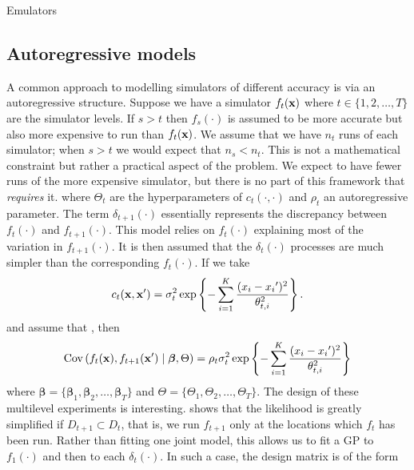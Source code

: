 \begin{chapter}{Emulators \label{Ch:Emulators}}
\subsection{Autoregressive models}
A common approach to modelling simulators of different accuracy is via an autoregressive structure. Suppose we have a simulator $f_t(\mathbf{x})$ where $t \in \{1, 2, \ldots, T\}$ are the simulator levels. If $s>t$ then $f_s(\cdot)$ is assumed to be more accurate but also more expensive to run than $f_t(\mathbf{x})$. We assume that we have $n_{t}$ runs of each simulator; when $s > t$ we would expect that $n_s < n_t$.  This is not a mathematical constraint but rather a practical aspect of the problem. We expect to have fewer runs of the more expensive simulator, but there is no part of this framework that \textit{requires} it. 
where $\Theta_t$ are the hyperparameters of $c_t(\cdot,\cdot)$ and $\rho_t$ an autoregressive parameter. The term $\delta_{t+1}(\cdot)$ essentially represents the discrepancy between $f_t(\cdot)$ and $f_{t+1}(\cdot)$. This model relies on $f_t(\cdot)$ explaining most of the variation in $f_{t+1}(\cdot)$. It is then assumed that the $\delta_t(\cdot)$ processes are much simpler than the corresponding $f_t(\cdot)$.
If we take \begin{equation}
  c_t(\mathbf{x}, \mathbf{x}') = \sigma_t^2 \exp \left\{ - \sum_{i = 1}^K \frac{(x_{i} - {x_i}')^2}{\theta_{t,i}^2} \right\}.
\end{equation}
and assume that , then
\begin{equation}
  \mathrm{Cov}\,(f_t(\mathbf{x}), f_{t+1}(\mathbf{x}')\mid \bm{\beta}, \Theta) = \rho_t \sigma_t^2 \exp \left\{ - \sum_{i = 1}^K \frac{(x_i - {x_i}')^2}{\theta_{t,i}^2} \right\}
\end{equation}
where $\bm{\beta} = \{\bm{\beta}_1, \bm{\beta}_2, \ldots, \bm{\beta}_T\}$ and $\Theta = \{\Theta_1, \Theta_2, \ldots, \Theta_T\}$.
The design of these multilevel experiments is interesting. \citet{Kennedy2000} shows that the likelihood is greatly simplified if $D_{t+1} \subset D_t$, that is, we run $f_{t+1}$ only at the locations which $f_t$ has been run. Rather than fitting one joint model, this allows us to fit a GP to $f_1(\cdot)$ and then to each $\delta_t(\cdot)$. In such a case, the design matrix is of the form

\end{chapter}

